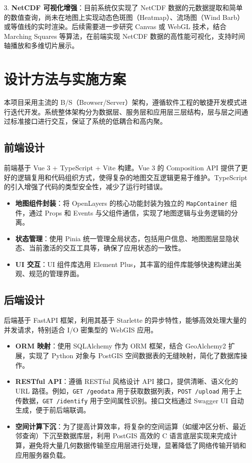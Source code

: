 \documentclass[a4paper,12pt]{ctexart}
\begin{document}
3. \textbf{NetCDF 可视化增强}：目前系统仅实现了 NetCDF 数据的元数据提取和简单的数值查询，尚未在地图上实现动态色斑图（Heatmap）、流场图（Wind Barb）或等值线的实时渲染。后续需要进一步研究 Canvas 或 WebGL 技术，结合 Marching Squares 等算法，在前端实现 NetCDF 数据的高性能可视化，支持时间轴播放和多维切片展示。

\section{设计方法与实施方案}

本项目采用主流的 B/S（Browser/Server）架构，遵循软件工程的敏捷开发模式进行迭代开发。系统整体架构分为数据层、服务层和应用层三层结构，层与层之间通过标准接口进行交互，保证了系统的低耦合和高内聚。

\subsection{前端设计}
前端基于 Vue 3 + TypeScript + Vite 构建。Vue 3 的 Composition API 提供了更好的逻辑复用和代码组织方式，使得复杂的地图交互逻辑更易于维护。TypeScript 的引入增强了代码的类型安全性，减少了运行时错误。
\begin{itemize}
    \item \textbf{地图组件封装}：将 OpenLayers 的核心功能封装为独立的 \texttt{MapContainer} 组件，通过 Props 和 Events 与父组件通信，实现了地图逻辑与业务逻辑的分离。
    \item \textbf{状态管理}：使用 Pinia 统一管理全局状态，包括用户信息、地图图层显隐状态、当前激活的交互工具等，确保了应用状态的一致性。
    \item \textbf{UI 交互}：UI 组件库选用 Element Plus，其丰富的组件库能够快速构建出美观、规范的管理界面。
\end{itemize}

\subsection{后端设计}
后端基于 FastAPI 框架，利用其基于 Starlette 的异步特性，能够高效处理大量的并发请求，特别适合 I/O 密集型的 WebGIS 应用。
\begin{itemize}
    \item \textbf{ORM 映射}：使用 SQLAlchemy 作为 ORM 框架，结合 GeoAlchemy2 扩展，实现了 Python 对象与 PostGIS 空间数据表的无缝映射，简化了数据库操作。
    \item \textbf{RESTful API}：遵循 RESTful 风格设计 API 接口，提供清晰、语义化的 URL 路径。例如，\texttt{GET /geodata} 用于获取数据列表，\texttt{POST /upload} 用于上传数据，\texttt{GET /identify} 用于空间属性识别。接口文档通过 Swagger UI 自动生成，便于前后端联调。
    \item \textbf{空间计算下沉}：为了提高计算效率，将复杂的空间运算（如缓冲区分析、最近邻查询）下沉至数据库层，利用 PostGIS 高效的 C 语言底层实现来完成计算，避免将大量几何数据传输至应用层进行处理，显著降低了网络传输开销和应用服务器负载。
\end{itemize}
\end{document}
